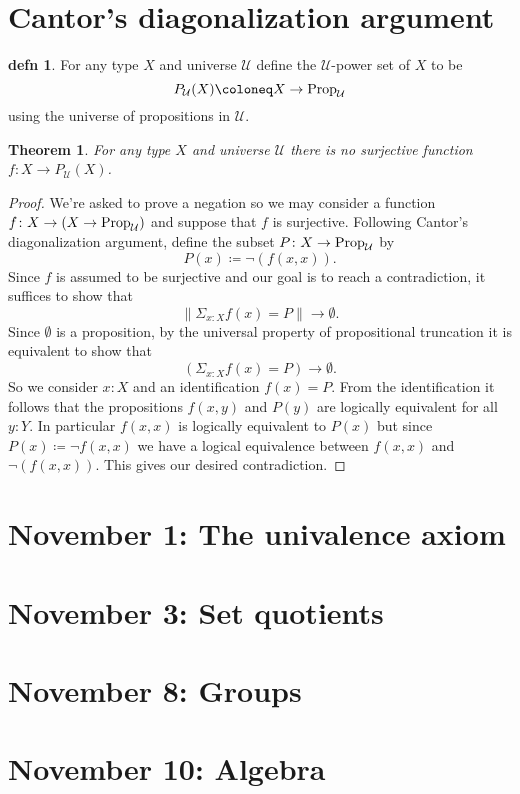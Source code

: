 \documentclass{amsart}
\theoremstyle{theorem}
\newtheorem*{thm}{Theorem}
\theoremstyle{definition}
\newtheorem*{defn}{defn}
\theoremstyle{remark}
\newcommand{\0}{\mathbbe{0}}
\newcommand{\1}{\mathbbe{1}}
\newcommand{\2}{\mathbbe{2}}
\newcommand{\3}{\mathbbe{3}}
\newcommand{\4}{\mathbbe{4}}
\newcommand{\type}[1]{{\textup{#1}}}
\newcommand{\UU}{{\mathcal{U}}}
\newcommand{\mere}[1]{\|{#1}\|}
\begin{document}
\section*{Cantor's diagonalization argument}

\begin{defn} For any type $X$ and universe $\UU$ define the $\UU$-power set of $X$ to be 
\[ P_{\UU}(X) \coloneq X \to \type{Prop}_{\UU}\]
using the universe of propositions in $\UU$.
\end{defn}

\begin{thm} For any type $X$ and universe $\UU$ there is no surjective function $f \colon X \to P_{\UU}(X)$.
\end{thm}
\begin{proof}
We're asked to prove a negation so we may consider a function $f \colon X \to (X \to \type{Prop}_{\UU})$ and suppose that $f$ is surjective. Following Cantor's diagonalization argument, define the subset $P \colon X \to \type{Prop}_{\UU}$ by
\[ P(x) \coloneq \neg(f(x,x)).\]
Since $f$ is assumed to be surjective and our goal is to reach a contradiction, it suffices to show that
\[ \mere{\Sigma_{x:X} f(x)=P} \to \emptyset.\]
Since $\emptyset$ is a proposition, by the universal property of propositional truncation it is equivalent to show that
\[ \left( {\Sigma_{x:X} f(x)=P}  \right) \to \emptyset.\]
So we consider $x:X$ and an identification $f(x)=P$. From the identification it follows that the propositions $f(x,y)$ and $P(y)$ are logically equivalent for all $y : Y$. In particular $f(x,x)$ is logically equivalent to $P(x)$ but since $P(x) \coloneq \neg f(x,x)$ we have a logical equivalence between $f(x,x)$ and $\neg(f(x,x))$. This gives our desired contradiction.
\end{proof}

\section*{November 1: The univalence axiom}
\section*{November 3: Set quotients}
\section*{November 8: Groups}
\section*{November 10: Algebra}
\end{document}
